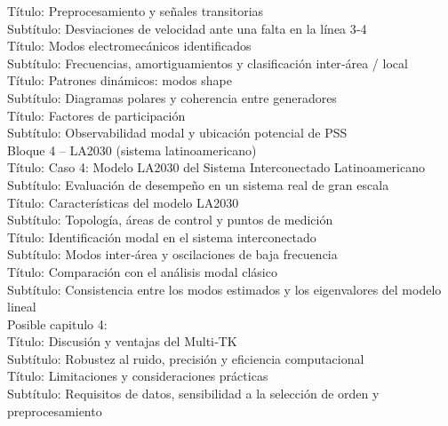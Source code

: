 Título: Preprocesamiento y señales transitorias\\
Subtítulo: Desviaciones de velocidad ante una falta en la línea 3‑4\\

Título: Modos electromecánicos identificados\\
Subtítulo: Frecuencias, amortiguamientos y clasificación inter‑área / local\\

Título: Patrones dinámicos: modos shape\\
Subtítulo: Diagramas polares y coherencia entre generadores\\

Título: Factores de participación\\
Subtítulo: Observabilidad modal y ubicación potencial de PSS\\

Bloque 4 – LA2030 (sistema latinoamericano)\\
Título: Caso 4: Modelo LA2030 del Sistema Interconectado Latinoamericano\\
Subtítulo: Evaluación de desempeño en un sistema real de gran escala\\

Título: Características del modelo LA2030\\
Subtítulo: Topología, áreas de control y puntos de medición\\

Título: Identificación modal en el sistema interconectado\\
Subtítulo: Modos inter‑área y oscilaciones de baja frecuencia\\

Título: Comparación con el análisis modal clásico\\
Subtítulo: Consistencia entre los modos estimados y los eigenvalores del modelo lineal\\

    Posible capitulo 4: \\

Título: Discusión y ventajas del Multi‑TK\\
Subtítulo: Robustez al ruido, precisión y eficiencia computacional\\

Título: Limitaciones y consideraciones prácticas\\
Subtítulo: Requisitos de datos, sensibilidad a la selección de orden y preprocesamiento\\

